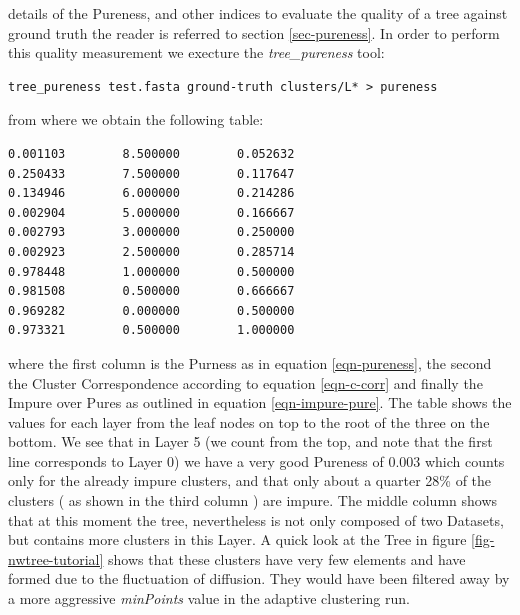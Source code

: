 details of the Pureness, and other indices to evaluate the quality of
a tree against ground truth the reader is referred to section
\ref{sec-pureness}. In order to perform this quality measurement we
execture the \emph{tree\_pureness} tool:
\begin{lstlisting}
tree_pureness test.fasta ground-truth clusters/L* > pureness
\end{lstlisting}
from where we obtain the following table:
\begin{lstlisting}
0.001103        8.500000        0.052632
0.250433        7.500000        0.117647
0.134946        6.000000        0.214286
0.002904        5.000000        0.166667
0.002793        3.000000        0.250000
0.002923        2.500000        0.285714
0.978448        1.000000        0.500000
0.981508        0.500000        0.666667
0.969282        0.000000        0.500000
0.973321        0.500000        1.000000
\end{lstlisting}
where the first column is the Purness as in equation
\ref{eqn-pureness}, the second the Cluster Correspondence according to
equation \ref{eqn-c-corr} and finally the Impure over Pures as
outlined in equation \ref{eqn-impure-pure}. The table shows the values
for each layer from the leaf nodes on top to the root of the three on
the bottom. We see that in Layer 5 (we count from the top, and note
that the first line corresponds to Layer 0)
we have a very good Pureness of 0.003 which counts only for the
already impure clusters, and that only about a quarter 28\% of the
clusters ( as shown in the third column ) are impure. The middle
column shows that at this moment the tree, nevertheless is not only
composed of two Datasets, but contains more clusters in this Layer. A
quick look at the Tree in figure \ref{fig-nwtree-tutorial} shows that
these clusters have very few elements and have formed due to the
fluctuation of diffusion. They would have been filtered away by a more
aggressive \emph{minPoints} value in the adaptive clustering run.



